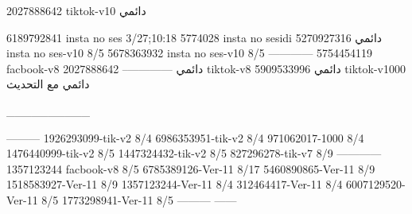 2027888642 tiktok-v10
دائمي

6189792841 insta no ses
3/27;10:18
5774028 insta no sesidi
دائمي
5270927316 insta no ses-v10
8/5
5678363932 insta no ses-v10
8/5
------------
5754454119 facbook-v8
دائمي
--------------
2027888642 tiktok-v8
دائمي
5909533996 tiktok-v1000
دائمي مع التحديث

__________

---------
1926293099-tik-v2
8/4
6986353951-tik-v2
8/4
971062017-1000
8/4
1476440999-tik-v2
8/5
1447324432-tik-v2
8/5
827296278-tik-v7
8/9
------------
1357123244 facbook-v8
8/5
6785389126-Ver-11
8/17
5460890865-Ver-11
8/9
1518583927-Ver-11
8/9
1357123244-Ver-11
8/4
312464417-Ver-11
8/4
6007129520-Ver-11
8/5
1773298941-Ver-11
8/5
---------
------
